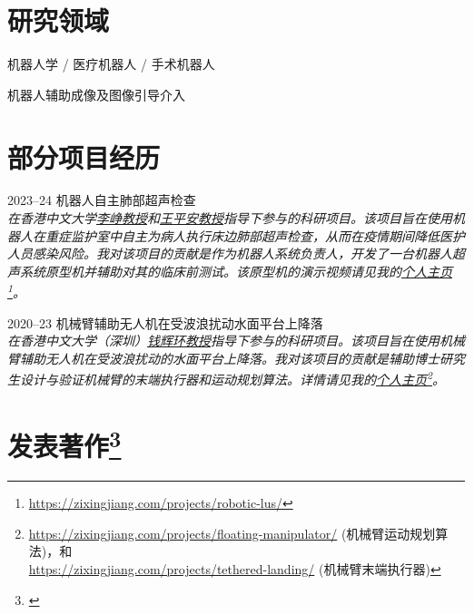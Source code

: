 \documentclass[utf8, 11pt,letterpaper]{report}
\newcommand{\listitemspace}{0.25em}
\renewenvironment{itemize}
{\begin{list}{}{\setlength{\leftmargin}{0em}
			\setlength{\parskip}{0em}
			\setlength{\itemsep}{\listitemspace}
			\setlength{\parsep}{\listitemspace}}}
	{\end{list}}
\begin{document}
\section*{研究领域}
\begin{itemize}
	\item 机器人学 / 医疗机器人 / 手术机器人
	\item 机器人辅助成像及图像引导介入 
\end{itemize}
	
\section*{部分项目经历}
\begin{tablist}
	\item[2023--24] \tab 机器人自主肺部超声检查\\
	\vspace{\listitemspace}
	 \emph{在香港中文大学\href{https://www.surgery.cuhk.edu.hk/profile.asp?alias=zli}{李峥教授}和\href{https://www.cse.cuhk.edu.hk/people/faculty/pheng-ann-heng/}{王平安教授}指导下参与的科研项目。该项目旨在使用机器人在重症监护室中自主为病人执行床边肺部超声检查，从而在疫情期间降低医护人员感染风险。我对该项目的贡献是作为机器人系统负责人，开发了一台机器人超声系统原型机并辅助对其的临床前测试。该原型机的演示视频请见我的\href{https://www.zixingjiang.com/projects/robotic-lus/}{个人主页}\footnote{ \href{https://zixingjiang.com/projects/robotic-lus/}{https://zixingjiang.com/projects/robotic-lus/}}。}
	
	\item[2020--23] \tab 机械臂辅助无人机在受波浪扰动水面平台上降落\\
	\vspace{\listitemspace}
	\textit{在香港中文大学（深圳）\href{https://sse.cuhk.edu.cn/en/faculty/qianhuihuan}{钱辉环教授}指导下参与的科研项目。该项目旨在使用机械臂辅助无人机在受波浪扰动的水面平台上降落。我对该项目的贡献是辅助博士研究生设计与验证机械臂的末端执行器和运动规划算法。详情请见我的\href{https://www.zixingjiang.com/projects\#marine-robotics}{个人主页}\footnote{ \href{https://zixingjiang.com/projects/floating-manipulator/}{https://zixingjiang.com/projects/floating-manipulator/} (机械臂运动规划算法)，和 \\ \href{https://zixingjiang.com/projects/tethered-landing/}{https://zixingjiang.com/projects/tethered-landing/}  (机械臂末端执行器)}。}
\end{tablist}
	
\section*{发表著作\protect\footnote{\label{authorship}}}
\end{document}
